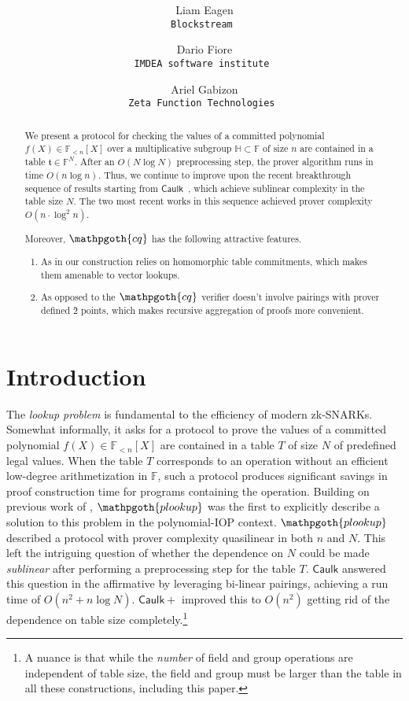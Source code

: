 \documentclass[11pt]{article} %
\title{ \bf \papertitle \\[0.72cm]}
\author{ Liam Eagen \\ \tt{Blockstream} \and  Dario Fiore \\ \tt{IMDEA software institute}  \and Ariel Gabizon \\ \tt{Zeta Function Technologies} }
\newcommand{\cq}{\ensuremath{\mathpgoth{cq} }\xspace}
\newcommand{\caulkp}{\ensuremath{\mathsf{\mathrel{Caulk}\mathrel{\scriptstyle{+}}}}\xspace}
\newcommand{\caulk}{\ensuremath{\mathsf{Caulk}}\xspace}
\newcommand{\plookup}{\ensuremath{\mathpgoth{plookup}}\xspace}
\newcommand{\F}{\ensuremath{\mathbb F}\xspace}
\newcommand{\polysofdeg}[1]{\ensuremath{\F_{< #1}[X]}\xspace}
\newcommand{\subspace}{\ensuremath{\mathbb{H}}\xspace}
\newcommand{\witsize}{\ensuremath{n}\xspace}
\newcommand{\tabsize}{\ensuremath{N}\xspace}
\newcommand{\tab}{\ensuremath{\mathfrak{t}}\xspace}
\begin{document}
    \maketitle
\begin{abstract}
 We present a protocol for checking the values of a committed polynomial $f(X)\in \polysofdeg{\witsize}$ over a multiplicative subgroup $\subspace\subset \F$ of size \witsize are contained in a
 table $\tab\in \F^\tabsize$. After an $O(\tabsize \log \tabsize)$ preprocessing step, the prover algorithm runs in time $O(\witsize\log \witsize)$.
 Thus, we continue to improve upon the recent breakthrough sequence of results\cite{caulk,caulkp,flookup,baloo} starting from \caulk~\cite{caulk}, which achieve sublinear complexity in the table size \tabsize. The two most recent works in this sequence \cite{flookup,baloo} achieved
 prover complexity $O(\witsize\cdot \log^2 \witsize)$.
 
 Moreover, \cq has the following attractive features.
 \begin{enumerate}
  \item As in \cite{caulk,caulkp,baloo} our construction relies on homomorphic table commitments, which makes them amenable to vector lookups.
 \item As opposed to \cite{caulk,caulkp,flookup,baloo} the \cq verifier doesn't involve pairings with prover defined \G2 points, which makes recursive aggregation of proofs more convenient.
 \end{enumerate}
 \end{abstract}


\section{Introduction}
The \emph{lookup problem} is fundamental to the efficiency of modern zk-SNARKs.
Somewhat informally, it asks for a protocol to prove the values of a committed polynomial $f(X)\in\polysofdeg{\witsize}$ are contained in a table $T$ of size $\tabsize$ of predefined legal values.
When the table $T$ corresponds to an operation without an efficient low-degree arithmetization in $\F$, such a protocol produces significant savings in proof construction time for programs containing the operation.
Building on previous work of \cite{arya}, \plookup \cite{plookup} was the first to explicitly describe a solution to this problem in the polynomial-IOP context. \plookup described a protocol with prover complexity quasilinear in both \witsize and \tabsize.
This left the intriguing question of whether the dependence on \tabsize could be made \emph{sublinear} after performing a preprocessing step for the table $T$.
\caulk \cite{caulk} answered this question in the affirmative by leveraging bi-linear pairings, achieving a run time of $O(\witsize^2+\witsize\log \tabsize)$. \caulkp \cite{caulkp} improved this to $O(\witsize^2)$ getting rid of the dependence on table size completely.\footnote{A nuance is that while the \emph{number} of field and group operations are independent of table size, the field and group must be larger than the table in all these constructions, including this paper.} 
\end{document}
